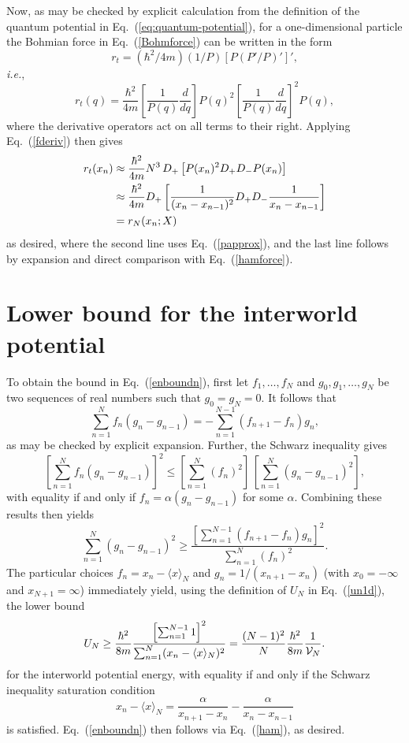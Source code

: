 \documentclass[twocolumn,aps,pra,amsmath,amssymb,superscriptaddress]{revtex4}
\newcommand{\ie}{{\em i.e.}}
\newcommand{\beq}{\begin{equation}}
\newcommand{\eeq}{\end{equation}}
\newcommand{\nn}{\nonumber}
\renewcommand{\(}{\left(}
\renewcommand{\)}{\right)}
\newcommand{\blk}{\color{black}}
\begin{document}
{Now, as may be checked by explicit calculation from the definition of the quantum potential in Eq.~(\ref{eq:quantum-potential}), for a one-dimensional particle the Bohmian force in Eq.~(\ref{Bohmforce}) can be written in the form 
\begin{equation} \label{niceforce}
r_t=(\hbar^2/4m)(1/{P})\left[ P (P'/{P})'\right]',
\end{equation} 
\ie,
\begin{equation} \nn
r_t(q) = \frac{\hbar^2}{4m} \left[\frac{1}{P(q)}\frac{d}{dq}\right] P(q)^2 \left[\frac{1}{P(q)}\frac{d}{dq}\right]^2 P(q) ,
\end{equation}
where the derivative operators act on all terms to their right.  Applying Eq.~(\ref{fderiv})
 then gives
\begin{align} \nn
r_t(x_n) &\approx \frac{\hbar^2}{4m} N^3\,D_+\left[ P(x_n)^2 D_+ D_- P(x_n)\right]\\ \nn
&\approx \frac{\hbar^2}{4m} D_+\left[ \frac{1}{(x_n-x_{n-1})^2} D_+ D_- \frac{1}{x_n-x_{n-1}}\right]\\ 
&= r_N(x_n; {\blk X})
\end{align}
as desired, where the second line uses Eq.~(\ref{papprox}), and the last line follows by expansion and direct comparison with Eq.~(\ref{hamforce}).


\section{Lower bound for the interworld potential}\label{apx:D}

To obtain the bound in Eq.~(\ref{enboundn}), first let $f_1,\dots, f_N$ and $g_0,g_1,\dots,g_N$ be two sequences of real numbers such that $g_0=g_N=0$.  
It follows that
\[ \sum_{n=1}^N f_n(g_n-g_{n-1})= -\sum_{n=1}^{N-1} (f_{n+1}-f_n)g_n, \]
as may be checked by explicit expansion.
Further, the Schwarz inequality gives
\[ \left[ \sum_{n=1}^N f_n(g_n-g_{n-1})\right]^2 \leq \left[\sum_{n=1}^N (f_n)^2\right]\,\left[\sum_{n=1}^N (g_n-g_{n-1})^2\right] ,\]
with equality if and only if $f_n=\alpha (g_n-g_{n-1})$ for some $\alpha$.  Combining these results then yields
\[ \sum_{n=1}^N (g_n-g_{n-1})^2 \geq \frac{\left[\sum_{n=1}^{N-1} (f_{n+1}-f_n)g_n\right]^2}{\sum_{n=1}^N (f_n)^2} . \]
The particular choices $f_n=x_n-\langle x\rangle_N$ and $g_n=1/(x_{n+1}-x_n)$ (with $x_0=-\infty$ and $x_{N+1}=\infty$) immediately yield, using the definition of $U_N$ in Eq.~(\ref{un1d}), the lower bound
\beq \label{unbound}
U_N \geq \frac{\hbar^2}{8m}  \frac{\left[\sum_{n=1}^{N-1} 1\right]^2}{\sum_{n=1}^N (x_n-\langle x\rangle_N)^2} = \frac{(N-1)^2}{N}\frac{\hbar^2}{8m}\frac{1}{\blk {\cal V}_N}. \eeq
for the interworld potential energy, with equality if and only if the Schwarz inequality saturation condition
\begin{equation} \label{sat}
x_n -\langle x\rangle_N = \frac{\alpha}{x_{n+1} - x_n} - \frac{\alpha}{x_{n} - x_{n-1}} 
\end{equation}
is satisfied.  Eq.~(\ref{enboundn}) \blk then follows via Eq.~(\ref{ham}), as desired.  

}
\end{document}

